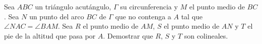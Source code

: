Sea $ABC$ un triángulo acutángulo, $\Gamma$ su circunferencia y $M$ el punto medio de $BC$. Sea $N$ un punto del arco $BC$ de $\Gamma$ que no contenga a $A$ tal que $\angle NAC= \angle BAM$. Sea $R$ el punto medio de $AM$, $S$ el punto medio de $AN$ y $T$ el pie de la altitud que pasa por $A$. Demostrar que $R$, $S$ y $T$ son colineales.
